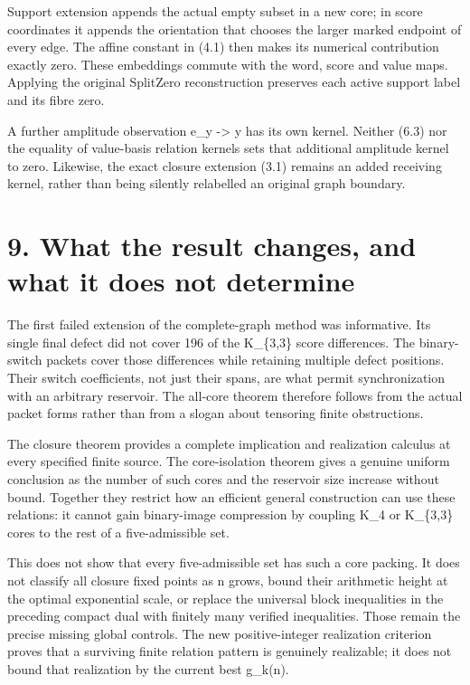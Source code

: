 Support extension appends the actual empty subset in a new core; in score coordinates it appends the orientation that chooses the larger marked endpoint of every edge. The affine constant in (4.1) then makes its numerical contribution exactly zero. These embeddings commute with the word, score and value maps. Applying the original SplitZero reconstruction preserves each active support label and its fibre zero.

A further amplitude observation e\_y -\textgreater{} y has its own kernel. Neither (6.3) nor the equality of value-basis relation kernels sets that additional amplitude kernel to zero. Likewise, the exact closure extension (3.1) remains an added receiving kernel, rather than being silently relabelled an original graph boundary.

\section{9. What the result changes, and what it does not determine}\label{n16-what-the-result-changes-and-what-it-does-not-determine}

The first failed extension of the complete-graph method was informative. Its single final defect did not cover 196 of the K\_\{3,3\} score differences. The binary-switch packets cover those differences while retaining multiple defect positions. Their switch coefficients, not just their spans, are what permit synchronization with an arbitrary reservoir. The all-core theorem therefore follows from the actual packet forms rather than from a slogan about tensoring finite obstructions.

The closure theorem provides a complete implication and realization calculus at every specified finite source. The core-isolation theorem gives a genuine uniform conclusion as the number of such cores and the reservoir size increase without bound. Together they restrict how an efficient general construction can use these relations: it cannot gain binary-image compression by coupling K\_4 or K\_\{3,3\} cores to the rest of a five-admissible set.

This does not show that every five-admissible set has such a core packing. It does not classify all closure fixed points as n grows, bound their arithmetic height at the optimal exponential scale, or replace the universal block inequalities in the preceding compact dual with finitely many verified inequalities. Those remain the precise missing global controls. The new positive-integer realization criterion proves that a surviving finite relation pattern is genuinely realizable; it does not bound that realization by the current best g\_k(n).

